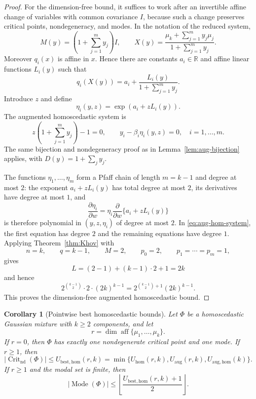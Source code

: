 \documentclass[11pt]{article}
\theoremstyle{plain}
\newtheorem{corollary}[theorem]{Corollary}
\theoremstyle{definition}
\theoremstyle{remark}
\numberwithin{equation}{section}
\DeclareMathOperator{\aff}{aff}
\DeclareMathOperator{\Crit}{Crit}
\DeclareMathOperator{\Mode}{Mode}
\newcommand{\R}{\mathbb{R}}
\begin{document}
\begin{proof}
For the dimension-free bound, it suffices to work after an invertible affine change of variables with common covariance $I$, because such a change preserves critical points, nondegeneracy, and modes. In the notation of the reduced system,
\[
M(y)=\left(1+\sum_{j=1}^m y_j\right)I,
\qquad
X(y)=\frac{\mu_k+\sum_{j=1}^m y_j\mu_j}{1+\sum_{j=1}^m y_j}.
\]
Moreover $q_i(x)$ is affine in $x$. Hence there are constants $a_i\in\R$ and affine linear functions $L_i(y)$ such that
\[
q_i(X(y))=a_i+\frac{L_i(y)}{1+\sum_{j=1}^m y_j}.
\]
Introduce $z$ and define
\[
\eta_i(y,z)=\exp(a_i+zL_i(y)).
\]
The augmented homoscedastic system is
\begin{equation}\label{eq:aug-hom-system}
z\left(1+\sum_{j=1}^m y_j\right)-1=0,
\qquad
y_i-\beta_i\eta_i(y,z)=0,\quad i=1,\dots,m.
\end{equation}
The same bijection and nondegeneracy proof as in Lemma~\ref{lem:aug-bijection} applies, with $D(y)=1+\sum_jy_j$.

The functions $\eta_1,\dots,\eta_m$ form a Pfaff chain of length $m=k-1$ and degree at most $2$: the exponent $a_i+zL_i(y)$ has total degree at most $2$, its derivatives have degree at most $1$, and
\[
\frac{\partial\eta_i}{\partial w}=\eta_i\frac{\partial}{\partial w}\{a_i+zL_i(y)\}
\]
is therefore polynomial in $(y,z,\eta_i)$ of degree at most $2$. In \eqref{eq:aug-hom-system}, the first equation has degree $2$ and the remaining equations have degree $1$. Applying Theorem~\ref{thm:Khov} with
\[
n=k,\qquad q=k-1,\qquad M=2,\qquad p_0=2,\qquad p_1=\cdots=p_m=1,
\]
gives
\[
L=(2-1)+(k-1)\cdot2+1=2k
\]
and hence
\[
2^{\binom{k-1}{2}}\cdot 2\cdot(2k)^{k-1}
=
2^{\binom{k-1}{2}+1}(2k)^{k-1}.
\]
This proves the dimension-free augmented homoscedastic bound.
\end{proof}

\begin{corollary}[Pointwise best homoscedastic bounds]\label{cor:best-hom-bound}
Let $\Phi$ be a homoscedastic Gaussian mixture with $k\ge2$ components, and let
\[
r=\dim\aff\{\mu_1,\dots,\mu_k\}.
\]
If $r=0$, then $\Phi$ has exactly one nondegenerate critical point and one mode. If $r\ge1$, then
\[
|\Crit_{\mathrm{nd}}(\Phi)|
\le
U_{\mathrm{best,hom}}(r,k)=
\min\{U_{\mathrm{hom}}(r,k),U_{\mathrm{aug}}(r,k),U_{\mathrm{aug,hom}}(k)\}.
\]
If $r\ge1$ and the modal set is finite, then
\[
|\Mode(\Phi)|\le
\left\lfloor\frac{U_{\mathrm{best,hom}}(r,k)+1}{2}\right\rfloor.
\]
\end{corollary}
\end{document}
